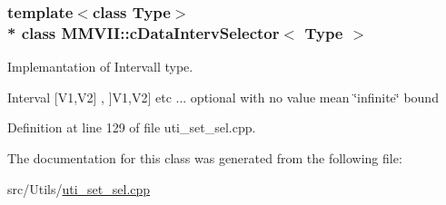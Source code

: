 \subsubsection*{template$<$class Type$>$\\*
class M\+M\+V\+I\+I\+::c\+Data\+Interv\+Selector$<$ Type $>$}

Implemantation of Intervall type. 

Interval \mbox{[}V1,V2\mbox{]} , \mbox{]}V1,V2\mbox{]} etc ... optional with no value mean \char`\"{}infinite\char`\"{} bound 

Definition at line 129 of file uti\+\_\+set\+\_\+sel.\+cpp.



The documentation for this class was generated from the following file\+:\begin{DoxyCompactItemize}
\item 
src/\+Utils/\hyperlink{uti__set__sel_8cpp}{uti\+\_\+set\+\_\+sel.\+cpp}\end{DoxyCompactItemize}
